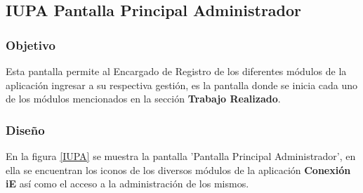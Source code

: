 \subsection{IUPA Pantalla Principal Administrador}

\subsubsection{Objetivo}

	
 	Esta pantalla permite al Encargado de Registro de los diferentes módulos de la aplicación ingresar a su respectiva gestión, es la pantalla donde se inicia cada uno de los módulos mencionados en la sección \textbf{Trabajo Realizado}.
\subsubsection{Diseño}


    En la figura \ref{IUPA} se muestra la pantalla 'Pantalla Principal Administrador', en ella se encuentran los iconos de los diversos módulos de la aplicación \textbf{Conexión iE} así como el acceso a la administración de los mismos.




